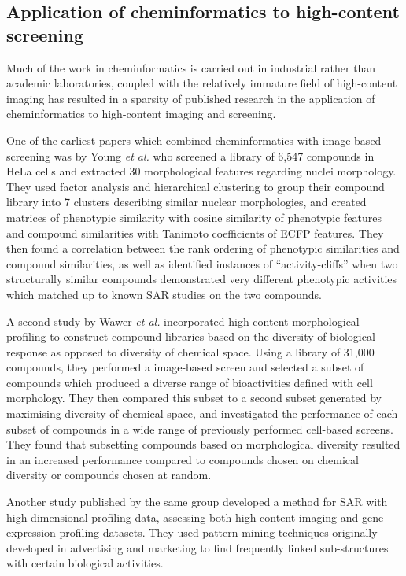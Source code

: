 \documentclass[a4paper,11pt,twoside,openright]{scrbook}
\begin{document}
\subsection{Application of cheminformatics to high-content screening}
Much of the work in cheminformatics is carried out in industrial rather than academic laboratories, coupled with the 
relatively immature field of high-content imaging has resulted in a sparsity of published research in the application 
of cheminformatics to high-content imaging and screening.

One of the earliest papers which combined cheminformatics with image-based screening was by Young \textit{et 
al.}\cite{Young2008} who screened a library of 6,547 compounds in HeLa cells and extracted 30 morphological features 
regarding nuclei morphology.
They used factor analysis and hierarchical clustering to group their compound library into 7 clusters describing 
similar nuclear morphologies, and created matrices of phenotypic similarity with cosine similarity of phenotypic 
features and compound similarities with Tanimoto coefficients of ECFP features.
They then found a correlation between the rank ordering of phenotypic similarities and compound similarities, as well 
as identified instances of ``activity-cliffs'' when two structurally similar compounds demonstrated very different 
phenotypic activities which matched up to known SAR studies on the two compounds.

A second study by Wawer \textit{et al.}\cite{Wawer2014b} incorporated high-content morphological profiling to construct 
compound libraries based on the diversity of biological response as opposed to diversity of chemical space.
Using a library of 31,000 compounds, they performed a image-based screen and selected a subset of compounds which 
produced a diverse range of bioactivities defined with cell morphology.
They then compared this subset to a second subset generated by maximising diversity of chemical space, and investigated 
the performance of each subset of compounds in a wide range of previously performed cell-based screens.
They found that subsetting compounds based on morphological diversity resulted in an increased performance compared to 
compounds chosen on chemical diversity or compounds chosen at random.

Another study published by the same group developed a method for SAR with high-dimensional profiling data, assessing 
both high-content imaging and gene expression profiling datasets.
They used pattern mining techniques originally developed in advertising and marketing to find frequently linked 
sub-structures with certain biological activities. \cite{Wawer2014c}
\end{document}
